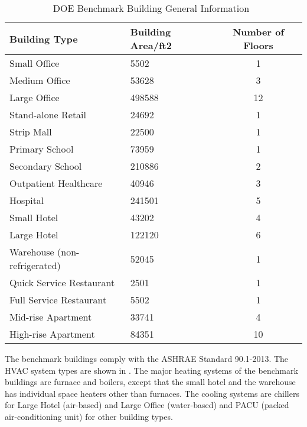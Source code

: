 \begin{table}[h!]
  \centering
  \begin{tabular}{l|l|c}
    \hline
Building Type                & Building Area/ft2 & Number of Floors\\
    \hline
Small Office                 & 5502              & 1\\
Medium Office                & 53628             & 3\\
Large Office                 & 498588            & 12\\
Stand-alone Retail           & 24692             & 1\\
Strip Mall                   & 22500             & 1\\
Primary School               & 73959             & 1\\
Secondary School             & 210886            & 2\\
Outpatient Healthcare        & 40946             & 3\\
Hospital                     & 241501            & 5\\
Small Hotel                  & 43202             & 4\\
Large Hotel                  & 122120            & 6\\
Warehouse (non-refrigerated) & 52045             & 1\\
Quick Service Restaurant     & 2501              & 1\\
Full Service Restaurant      & 5502              & 1\\
Mid-rise Apartment           & 33741             & 4\\
High-rise Apartment          & 84351             & 10\\
    \hline
\end{tabular}
\caption{DOE Benchmark Building General Information~\cite{DOE2015}}
\label{tab:doeModel}
\end{table}

The benchmark buildings comply with the ASHRAE Standard 90.1-2013. The
HVAC system types are shown in . The major heating
systems of the benchmark buildings are furnace and boilers, except
that the small hotel and the warehouse has individual space heaters
other than furnaces. The cooling systems are chillers for Large Hotel
(air-based) and Large Office (water-based) and PACU (packed
air-conditioning unit) for other building types.~


